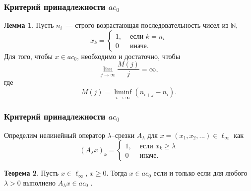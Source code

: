 \documentclass[10pt,pdf,hyperref={unicode},aspectratio=169]{beamer}
\theoremstyle{definition}
\newtheorem{llemma}{Лемма}
\newtheorem{ttheorem}[llemma]{Теорема}
\begin{document}
\begin{frame}
	\frametitle{Критерий принадлежности $ac_0$~\cite{our-mz2019ac0}}


	\begin{llemma}
		Пусть $n_i$~--- строго возрастающая последовательность чисел из $\mathbb{N}$,
		\begin{equation*}
			x_k = \left\{\begin{array}{ll}
				1, & \mbox{~если~} k = n_i
				\\
				0  & \mbox{~иначе.~}
			\end{array}\right.
		\end{equation*}
		Для того, чтобы $x\in ac_0$,
		необходимо и достаточно, чтобы
		\begin{equation}\label{lim_M(j)/j}
			\lim_{j \to \infty} \frac{M(j)}{j} = \infty
			,
		\end{equation}
		где
		\begin{equation*}
			M(j) = \liminf_{i\to\infty} (n_{i+j} - n_i)
			.
		\end{equation*}
	\end{llemma}


\end{frame}



\begin{frame}
	\frametitle{Критерий принадлежности $ac_0$~\cite{our-mz2019ac0}}


	Определим нелинейный оператор $\lambda$--срезки $A_\lambda$
	для $x = (x_1, x_2, ...)\in\ell_\infty$ как
	\begin{equation*}
		(A_\lambda x)_k = \begin{cases}
			1, & \mbox{~если~} x_k \geq \lambda
			\\
			0  & \mbox{~иначе.~}
		\end{cases}
	\end{equation*}

	\begin{ttheorem}
		\label{thm:lambda_prelim}
		Пусть $x\in\ell_\infty$, $x\geq 0$.
		Тогда
		$
			x\in ac_0
		$
		если и только если
		для любого $\lambda > 0$
		выполнено
		$
			A_\lambda x \in ac_0
		$
		.
	\end{ttheorem}

\end{frame}
\end{document}
